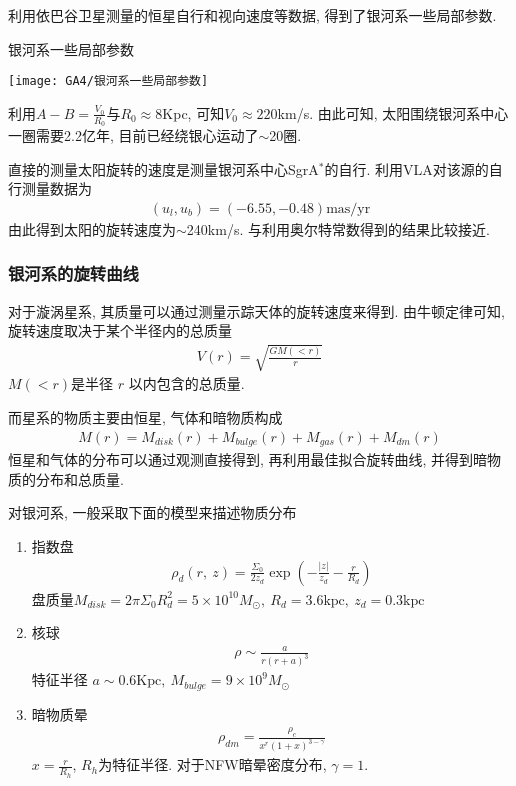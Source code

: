 利用依巴谷卫星测量的恒星自行和视向速度等数据, 得到了银河系一些局部参数. 
\begin{table}[!htb]
    \centering
    \caption{银河系一些局部参数}
    \texttt{[image: GA4/银河系一些局部参数]}
\end{table}

利用$A-B=\frac{V_0}{R_0}$与$R_0\approx 8$Kpc, 可知$V_0\approx 220$km/s. 由此可知, 太阳围绕银河系中心一圈需要2.2亿年, 目前已经绕银心运动了$\sim$20圈. 

直接的测量太阳旋转的速度是测量银河系中心SgrA${}^*$的自行. 利用VLA对该源的自行测量数据为 
\begin{align*}
    (u_l,u_b)=(-6.55, -0.48) \text{mas/yr}
\end{align*} 
由此得到太阳的旋转速度为$\sim$240km/s. 与利用奥尔特常数得到的结果比较接近. 

\subsubsection{银河系的旋转曲线}
对于漩涡星系, 其质量可以通过测量示踪天体的旋转速度来得到. 由牛顿定律可知, 
旋转速度取决于某个半径内的总质量
\begin{align*}
    V(r)=\sqrt{\frac{GM(<r)}{r}}
\end{align*}
$M(<r)$是半径 $r$ 以内包含的总质量. 

而星系的物质主要由恒星, 气体和暗物质构成
\begin{align*}
    M(r)=M_{disk}(r)+M_{bulge}(r)+M_{gas}(r)+M_{dm}(r)
\end{align*}
恒星和气体的分布可以通过观测直接得到, 再利用最佳拟合旋转曲线, 并得到暗物质的分布和总质量. 

对银河系, 一般采取下面的模型来描述物质分布
\begin{enumerate}
    \item 指数盘
    \begin{align*}
        \rho_d (r,\ z)=\frac{\Sigma_0}{2 z_d}\exp\left( -\frac{|z|}{z_d}-\frac{r}{R_d} \right)
    \end{align*}
    盘质量$M_{disk}=2\pi \Sigma_0 R_d^2=5\times 10^{10}M_{\odot},\ R_d=3.6\text{kpc},\ z_d=0.3\text{kpc}$
    \item 核球
    \begin{align*}
        \rho \sim \frac{a}{r(r+a)^3}
    \end{align*}
    特征半径 $a\sim 0.6\text{Kpc},\ M_{bulge}=9\times 10^9 M_{\odot}$
    \item 暗物质晕
    \begin{align*}
        \rho_{dm}=\frac{\rho_c}{x^{r}(1+x)^{3-\gamma}}
    \end{align*}
    $x=\frac{r}{R_h}$, $R_h$为特征半径. 对于NFW暗晕密度分布, $\gamma =1$. 
\end{enumerate}

